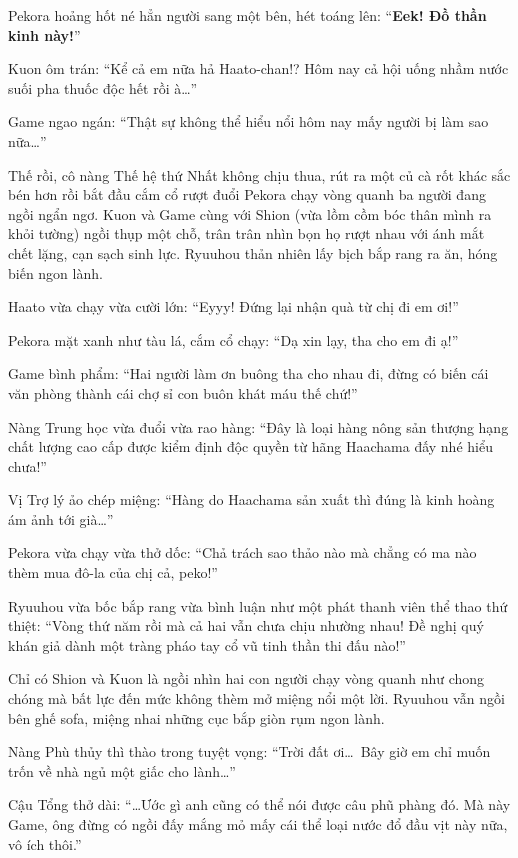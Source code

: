 \documentclass[../main.tex]{subfiles}
\begin{document}
Pekora hoảng hốt né hẳn người sang một bên, hét toáng lên: ``\textbf{Eek! Đồ thần kinh này!}''

Kuon ôm trán: ``Kể cả em nữa hả Haato-chan!? Hôm nay cả hội uống nhầm nước suối pha thuốc độc hết rồi à\dots''

Game ngao ngán: ``Thật sự không thể hiểu nổi hôm nay mấy người bị làm sao nữa\dots''

Thế rồi, cô nàng Thế hệ thứ Nhất không chịu thua, rút ra một củ cà rốt khác sắc bén hơn rồi bắt đầu cắm cổ rượt đuổi Pekora chạy vòng quanh ba người đang ngồi ngẩn ngơ. Kuon và Game cùng với Shion (vừa lồm cồm bóc thân mình ra khỏi tường) ngồi thụp một chỗ, trân trân nhìn bọn họ rượt nhau với ánh mắt chết lặng, cạn sạch sinh lực. Ryuuhou thản nhiên lấy bịch bắp rang ra ăn, hóng biến ngon lành.


Haato vừa chạy vừa cười lớn: ``Eyyy! Đứng lại nhận quà từ chị đi em ơi!''

Pekora mặt xanh như tàu lá, cắm cổ chạy: ``Dạ xin lạy, tha cho em đi ạ!''

Game bình phẩm: ``Hai người làm ơn buông tha cho nhau đi, đừng có biến cái văn phòng thành cái chợ sỉ con buôn khát máu thế chứ!''

Nàng Trung học vừa đuổi vừa rao hàng: ``Đây là loại hàng nông sản thượng hạng chất lượng cao cấp được kiểm định độc quyền từ hãng Haachama đấy nhé hiểu chưa!''

Vị Trợ lý ảo chép miệng: ``Hàng do Haachama sản xuất thì đúng là kinh hoàng ám ảnh tới già\dots''

Pekora vừa chạy vừa thở dốc: ``Chả trách sao thảo nào mà chẳng có ma nào thèm mua đô-la của chị cả, peko!''

Ryuuhou vừa bốc bắp rang vừa bình luận như một phát thanh viên thể thao thứ thiệt: ``Vòng thứ năm rồi mà cả hai vẫn chưa chịu nhường nhau! Đề nghị quý khán giả dành một tràng pháo tay cổ vũ tinh thần thi đấu nào!''

Chỉ có Shion và Kuon là ngồi nhìn hai con người chạy vòng quanh như chong chóng mà bất lực đến mức không thèm mở miệng nổi một lời. Ryuuhou vẫn ngồi bên ghế sofa, miệng nhai những cục bắp giòn rụm ngon lành.

Nàng Phù thủy  thì thào trong tuyệt vọng: ``Trời đất ơi\dots\ Bây giờ em chỉ muốn trốn về nhà ngủ một giấc cho lành\dots''

Cậu Tổng thở dài: ``\dots Ước gì anh cũng có thể nói được câu phũ phàng đó. Mà này Game, ông đừng có ngồi đấy mắng mỏ mấy cái thể loại nước đổ đầu vịt này nữa, vô ích thôi.''
\end{document}
